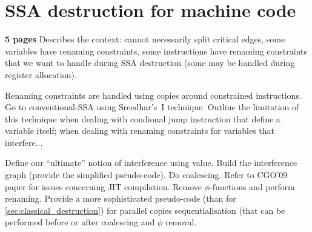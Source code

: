 

\section{SSA destruction for machine code }
\label{sec:advanced_destruction}
\textbf{5 pages}
Describes the context: cannot necessarily split critical edges, some variables have renaming constraints, some instructions have renaming constraints that we want to handle during SSA destruction (some may be handled during register allocation). 

Renaming constraints are handled using copies around constrained instructions. Go to conventional-SSA using Sreedhar's~I technique. Outline the limitation of this technique when dealing with condional jump instruction that define a variable itself; when dealing with renaming constraints for variables that interfere...

Define our ``ultimate'' notion of interference using value. Build the interference graph (provide the simplified pseudo-code). Do coalescing. Refer to CGO'09 paper for issues concerning JIT compilation. Remove $\phi$-functions and perform renaming. Provide a more sophisticated pseudo-code (than for \ref{sec:classical_destruction}) for parallel copies sequentialisation (that can be performed before or after coalescing and $\phi$ removal.

